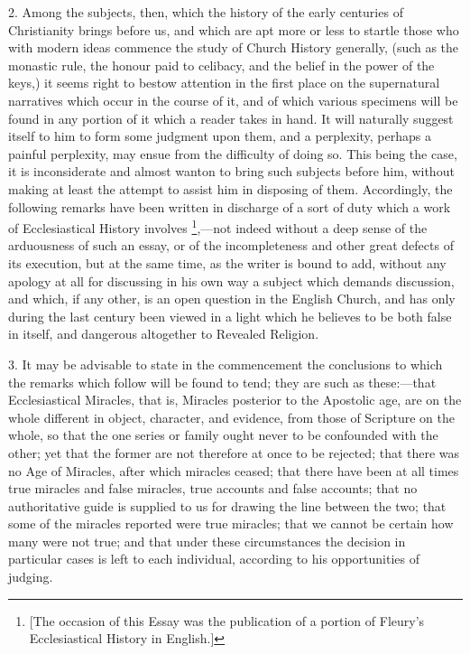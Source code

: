 2.
Among the subjects, then, which the history of the early centuries of
Christianity brings before us, and which are apt more or less to
startle those who with modern ideas commence the study of Church
History generally, (such as the monastic rule, the honour paid to
celibacy, and the belief in the power of the keys,) it seems right to
bestow attention in the first place on the supernatural narratives
which occur in the course of it, and of which various specimens will
be found in any portion of it which a reader takes in hand. It will
naturally suggest itself to him to form some judgment upon them,
and a perplexity, perhaps a painful perplexity, may ensue from the
difficulty of doing so. This being the case, it is inconsiderate and
almost wanton to bring such subjects before him, without making at
least the attempt to assist him in disposing of them. Accordingly, the
following remarks have been written in discharge of a sort of duty
which a work of Ecclesiastical History involves \footnote{[The occasion of this Essay was the publication
of a portion of Fleury's Ecclesiastical History in English.]},—not indeed without a deep sense of the arduousness of such an essay,
or of the incompleteness and other great defects of its execution, but
at the same time, as the writer is bound to add, without any apology
at all for discussing in his own way a subject which demands
discussion, and which, if any other, is an open question in the
English Church, and has only during the last century been viewed in a
light which he believes to be both false in itself, and dangerous
altogether to Revealed Religion.

3.
It may be advisable to state in the commencement the conclusions to
which the remarks which follow will be found to tend; they are such as
these:—that Ecclesiastical Miracles, that is, Miracles posterior to
the Apostolic age, are on the whole different in object, character,
and evidence, from those of Scripture on the whole, so that the one
series or family ought never to be confounded with the other; yet that the former are not therefore at once to be rejected; that
there was no Age of Miracles, after which miracles ceased; that there
have been at all times true miracles and false miracles, true accounts
and false accounts; that no authoritative guide is supplied to us for
drawing the line between the two; that some of the miracles reported
were true miracles; that we cannot be certain how many were not true;
and that under these circumstances the decision in particular cases is
left to each individual, according to his opportunities of judging.

